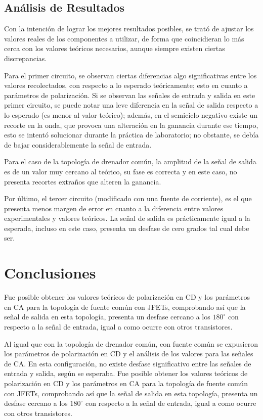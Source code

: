 \documentclass[journal]{IEEEtran}
\begin{document}
\subsection{Análisis de Resultados}
Con la intención de lograr los mejores resultados posibles, se trató de ajustar los 
valores reales de los componentes a utilizar, de forma que coincidieran lo más cerca con
los valores teóricos necesarios, aunque siempre existen ciertas discrepancias.

Para el primer circuito, se observan ciertas diferencias algo significativas entre los valores
recolectados, con respecto a lo esperado teóricamente; esto en cuanto a parámetros de polarización. 
Si se observan las señales de entrada y salida en este primer circuito, se puede notar una leve diferencia
en la señal de salida respecto a lo esperado (es menor al valor teórico); además, en el semiciclo negativo
existe un recorte en la onda, que provoca una alteración en la ganancia durante ese tiempo, esto se intentó 
solucionar durante la práctica de laboratorio; no obstante, se debía de bajar considerablemente la señal de entrada.

Para el caso de la topología de drenador común, la amplitud de la señal de salida es de un valor muy cercano al teórico, 
su fase es correcta y en este caso, no presenta recortes extraños que alteren la ganancia. 

Por último, el tercer circuito (modificado con una fuente de corriente), es el que presenta menos margen de error
en cuanto a la diferencia entre valores experimentales y valores teóricos. La señal de salida es prácticamente
igual a la esperada, incluso en este caso, presenta un desfase de cero grados tal cual debe ser. 

\section{Conclusiones}
Fue posible obtener los valores teóricos de polarización en CD y los parámetros en CA para la topología de fuente
común con JFETs, comprobando así que la señal de salida en esta topología, presenta un desfase cercano a los $180^\circ$
con respecto a la señal de entrada, igual a como ocurre con otros transistores.

Al igual que con la topología de drenador común, con fuente común se expusieron los parámetros de polarización en CD
y el análisis de los valores para las señales de CA. En esta configuración, no existe desfase significativo entre las 
señales de entrada y salida, según se esperaba. 
Fue posible obtener los valores teóricos de polarización en CD y los parámetros en CA para la topología de fuente
común con JFETs, comprobando así que la señal de salida en esta topología, presenta un desfase cercano a los $180^\circ$
con respecto a la señal de entrada, igual a como ocurre con otros transistores.
\end{document}
